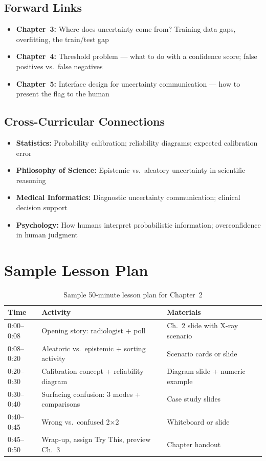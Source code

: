 \subsection{Forward Links}
\begin{itemize}
    \item \textbf{Chapter~3:} Where does uncertainty come from? Training data gaps, overfitting, the train/test gap
    \item \textbf{Chapter~4:} Threshold problem --- what to do with a confidence score; false positives vs.\ false negatives
    \item \textbf{Chapter~5:} Interface design for uncertainty communication --- how to present the flag to the human
\end{itemize}

\subsection{Cross-Curricular Connections}
\begin{itemize}
    \item \textbf{Statistics:} Probability calibration; reliability diagrams; expected calibration error
    \item \textbf{Philosophy of Science:} Epistemic vs.\ aleatory uncertainty in scientific reasoning
    \item \textbf{Medical Informatics:} Diagnostic uncertainty communication; clinical decision support
    \item \textbf{Psychology:} How humans interpret probabilistic information; overconfidence in human judgment
\end{itemize}

\section{Sample Lesson Plan}

\begin{table}[htbp]
\caption{Sample 50-minute lesson plan for Chapter~2}
\label{tab:lesson-plan-ch02}
\centering
\begin{tabular}{@{}p{2.5cm}p{6cm}p{4cm}@{}}
\toprule
\textbf{Time} & \textbf{Activity} & \textbf{Materials} \\
\midrule
0:00--0:08 & Opening story: radiologist + poll & Ch.\ 2 slide with X-ray scenario \\
0:08--0:20 & Aleatoric vs.\ epistemic + sorting activity & Scenario cards or slide \\
0:20--0:30 & Calibration concept + reliability diagram & Diagram slide + numeric example \\
0:30--0:40 & Surfacing confusion: 3 modes + comparisons & Case study slides \\
0:40--0:45 & Wrong vs.\ confused 2×2 & Whiteboard or slide \\
0:45--0:50 & Wrap-up, assign Try This, preview Ch.\ 3 & Chapter handout \\
\bottomrule
\end{tabular}
\end{table}

